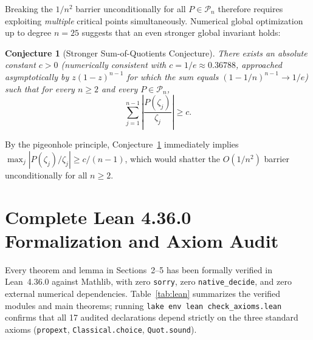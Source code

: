 \documentclass[11pt,a4paper]{article}
\newtheorem{conjecture}[theorem]{Conjecture}
\theoremstyle{definition}
\theoremstyle{remark}
\begin{document}
Breaking the $1/n^2$ barrier unconditionally for all $P \in \mathcal{P}_n$ therefore requires exploiting \emph{multiple} critical points simultaneously. Numerical global optimization up to degree $n = 25$ suggests that an even stronger global invariant holds:

\begin{conjecture}[Stronger Sum-of-Quotients Conjecture]
\label{conj:sum}
There exists an absolute constant $c > 0$ (numerically consistent with $c = 1/e \approx 0.36788$, approached asymptotically by $z(1 - z)^{n-1}$ for which the sum equals $(1 - 1/n)^{n-1} \to 1/e$) such that for every $n \ge 2$ and every $P \in \mathcal{P}_n$,
\[
\sum_{j=1}^{n-1} \left|\frac{P(\zeta_j)}{\zeta_j}\right| \ge c.
\]
\end{conjecture}

By the pigeonhole principle, Conjecture~\ref{conj:sum} immediately implies $\max_j |P(\zeta_j)/\zeta_j| \ge c/(n-1)$, which would shatter the $O(1/n^2)$ barrier unconditionally for all $n \ge 2$.

\section{Complete Lean 4.36.0 Formalization and Axiom Audit}
\label{sec:lean}

Every theorem and lemma in Sections~2--5 has been formally verified in Lean~4.36.0 against Mathlib, with zero \texttt{sorry}, zero \texttt{native\_decide}, and zero external numerical dependencies. Table~\ref{tab:lean} summarizes the verified modules and main theorems; running \texttt{lake env lean check\_axioms.lean} confirms that all 17 audited declarations depend strictly on the three standard axioms (\texttt{propext}, \texttt{Classical.choice}, \texttt{Quot.sound}).
\end{document}
